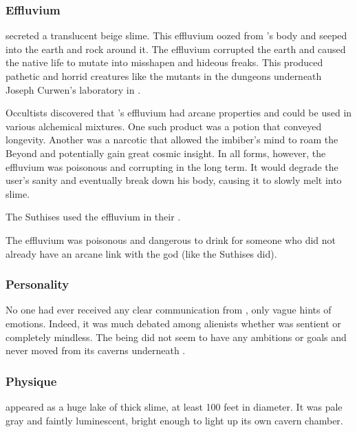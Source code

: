 \subsubsection{Effluvium}
\Ubloth secreted a translucent beige slime. 
This effluvium oozed from \Ubloth's body and seeped into the earth and rock around it. 
The effluvium corrupted the earth and caused the native life to mutate into misshapen and hideous freaks. 
This produced pathetic and horrid creatures like the mutants in the dungeons underneath Joseph Curwen's laboratory in \cite[p.267--268]{HPLovecraft:TheCaseofCharlesDexterWard}. 

Occultists discovered that \Ubloth's effluvium had arcane properties and could be used in various alchemical mixtures. 
One such product was a potion that conveyed longevity.
Another was a narcotic that allowed the imbiber's mind to roam the Beyond and potentially gain great cosmic insight. 
In all forms, however, the effluvium was poisonous and corrupting in the long term. 
It would degrade the user's sanity and eventually break down his body, causing it to slowly melt into slime. 

The Suthises used the effluvium in their .

The effluvium was poisonous and dangerous to drink for someone who did not already have an arcane link with the god (like the Suthises did). 





\subsubsection{Personality}
No one had ever received any clear communication from \Ubloth, only vague hints of emotions. 
Indeed, it was much debated among alienists whether \Ubloth was sentient or completely mindless. 
The being did not seem to have any ambitions or goals and never moved from its caverns underneath \Shrun.





\subsubsection{Physique}
\Ubloth appeared as a huge lake of thick slime, at least 100 feet in diameter. 
It was pale gray and faintly luminescent, bright enough to light up its own cavern chamber. 





